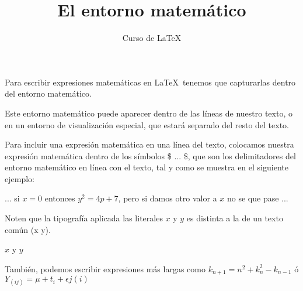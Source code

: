 \documentclass[10pt,letterpaper]{article}
\title{El entorno matemático}
\author{Curso de \LaTeX}
\begin{document}
\maketitle

Para escribir expresiones matemáticas en \LaTeX\ tenemos que capturarlas dentro del entorno matemático.

Este entorno matemático puede aparecer dentro de las líneas de nuestro texto, o en un entorno de visualización especial, que estará separado del resto del texto. 

Para incluir una expresión matemática en una línea del texto, colocamos nuestra expresión matemática dentro de los símbolos \$ ... \$, que son los delimitadores del entorno matemático en línea con el texto, tal y como se muestra en el siguiente ejemplo:

... si $x=0$ entonces $y^2 = 4p+7$, pero si damos otro valor a $x$ no se que pase ... 

Noten que la tipografía aplicada las literales $x$ y $y$ es distinta a la de un texto común (x y).


\(x\) y \(y\)

También, podemos escribir expresiones más largas como $k_{n+1}=n^2 + k_n^2 - k_{n-1}$ ó $Y_{(ij)} = \mu + t_i + \epsilon  j (i) $
\end{document}
